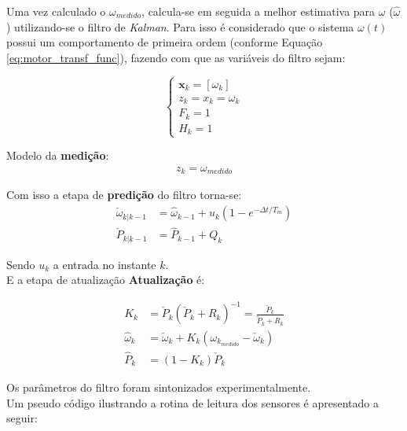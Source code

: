 Uma vez calculado o $\omega_{medido}$, calcula-se em seguida a melhor estimativa para $\omega$ ($\hat{\omega}$) utilizando-se o filtro de \emph{Kalman}. Para isso é considerado que o sistema $\omega(t)$ possui um comportamento de primeira ordem (conforme Equação \ref{eq:motor_transf_func}), fazendo com que as variáveis do filtro sejam:

\begin{equation*}
\begin{cases}
    \textbf{x}_k = \left[ \omega_k \right]\\
    z_k = x_k = \omega_k\\
    F_k = 1\\
    H_k = 1
\end{cases}
\end{equation*}

Modelo da \textbf{medição}:
\begin{align*}
z_k = \omega_{medido}
\end{align*}

Com isso a etapa de \textbf{predição} do filtro torna-se:
\begin{align*}
    \check{\omega}_{k|k-1} &= \hat{\omega}_{k-1} + u_k\left( 1 - e^{-\Delta{t}/T_m} \right)\\
    \check{P}_{k|k-1} &= \hat{P}_{k-1} + Q_k
\end{align*}

Sendo $u_k$ a entrada no instante $k$.\\

E a etapa de atualização \textbf{Atualização} é:

\begin{align*}
K_k &= \check{P}_k \left( \check{P}_k + R_k \right)^{-1} = \frac{\check{P}_k}{\check{P}_k + R_k}\\
\hat{\omega}_k &= \check{\omega}_k + K_k \left( \omega_{k_{medido}} - \check{\omega}_k \right)\\
\hat{P}_k &= \left( 1 - K_k \right) \check{P}_k
\end{align*}

Os parâmetros do filtro foram sintonizados experimentalmente.\\

Um pseudo código ilustrando a rotina de leitura dos sensores é apresentado a seguir:


